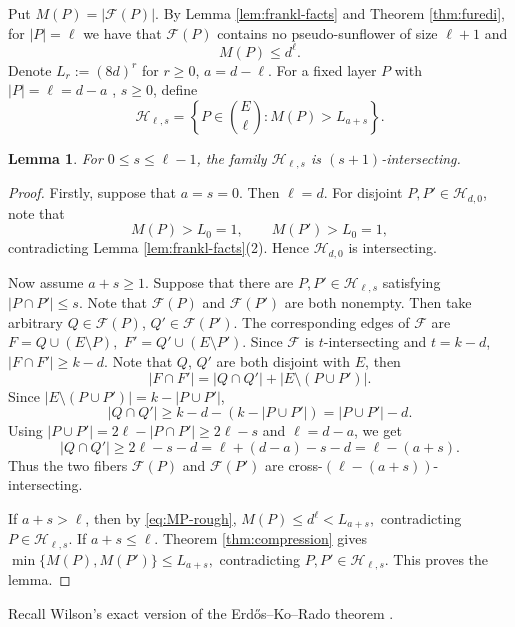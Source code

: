 \documentclass[11pt]{article}
\numberwithin{equation}{section}
\newtheorem{lemma}[theorem]{Lemma}
\begin{document}
	Put $M(P)=|\mathcal F(P)|.
	$ By Lemma \ref{lem:frankl-facts} and Theorem \ref{thm:furedi}, for $|P|=\ell$ we have that $\mathcal F(P)$ contains no pseudo-sunflower of size $\ell+1$ and
	\begin{equation}\label{eq:MP-rough}
		M(P)\le d^\ell.
	\end{equation}
	Denote
	$
	L_r:=(8d)^r
	$ for $r\ge0$, $a=d-\ell$.
	For a fixed layer $P$ with
	$
	|P|=\ell=d-a
	$
, $s\ge 0$, define
	\[
	\mathcal H_{\ell,s}
	=
	\left\{P\in\binom{E}{\ell}:M(P)>L_{a+s}\right\}.
	\]
	\begin{lemma}\label{lem:large-fibres-intersect}
		For $0\le s\le \ell-1$, the family $\mathcal H_{\ell,s}$ is $(s+1)$-intersecting.
	\end{lemma}
	\begin{proof}
		Firstly, suppose that $a=s=0$.  Then $\ell=d$.  For disjoint $P,P'\in\mathcal H_{d,0}$, note that
		\[
		M(P)>L_0=1,
		\qquad
		M(P')>L_0=1,
		\]
		contradicting Lemma \ref{lem:frankl-facts}(2).  Hence $\mathcal H_{d,0}$ is intersecting.
		
		Now assume $a+s\ge 1$.  Suppose that there are $P,P'\in\mathcal H_{\ell,s}$ satisfying
		$
		|P\cap P'|\le s.
		$
		Note that $\mathcal F(P)$ and $\mathcal F(P')$ are both nonempty. Then take arbitrary
		$
		Q\in\mathcal F(P)
		$, $
		Q'\in\mathcal F(P').
		$
		The corresponding edges of $\mathcal F$ are
		$
		F=Q\cup(E\setminus P),
		$ $
		F'=Q'\cup(E\setminus P').
		$
		Since $\mathcal F$ is $t$-intersecting and $t=k-d$,
		$
		|F\cap F'|\ge k-d.
		$
		Note that $Q$, $Q'$ are both disjoint with $E$, then
		\[
		|F\cap F'|
		=
		|Q\cap Q'|+|E\setminus(P\cup P')|.
		\]
		Since $|E\setminus(P\cup P')|=k-|P\cup P'|$,
		\[
		|Q\cap Q'|
		\ge
		k-d-(k-|P\cup P'|)=|P\cup P'|-d.
		\]
		Using $|P\cup P'|=2\ell-|P\cap P'|\ge 2\ell-s$ and $\ell=d-a$, we get
		\[
		|Q\cap Q'|
		\ge
		2\ell-s-d
		=\ell+(d-a)-s-d=
		\ell-(a+s).
		\]
		Thus the two fibers $\mathcal F(P)$ and $\mathcal F(P')$ are cross-$(\ell-(a+s))$-intersecting.
		
		If $a+s>\ell$, then by \eqref{eq:MP-rough},
		$
		M(P)\le d^\ell<L_{a+s},
		$
		contradicting $P\in\mathcal H_{\ell,s}$.  If $a+s\le \ell$.  Theorem \ref{thm:compression} gives
		$
		\min\{M(P),M(P')\}\le L_{a+s},
		$
		contradicting $P,P'\in\mathcal H_{\ell,s}$.  This proves the lemma.
	\end{proof}
	Recall Wilson's exact version of the Erd\H{o}s--Ko--Rado theorem \cite{EKR,Wilson}.
	
\end{document}
